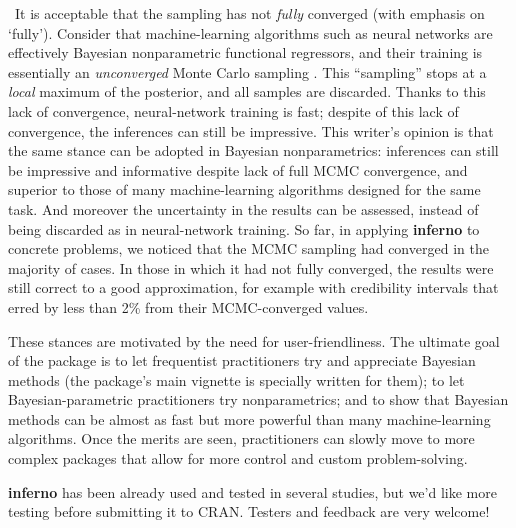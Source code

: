 \textbullet\ It is acceptable that the sampling has not \emph{fully} converged (with emphasis on `fully'). Consider that machine-learning algorithms such as neural networks are effectively Bayesian nonparametric functional regressors, and their training is essentially an \emph{unconverged} Monte Carlo sampling \citep{mackay1992,gal2016,mandtetal2017,huszar2017}. This ``sampling'' stops at a \emph{local} maximum of the posterior, and all samples are discarded. Thanks to this lack of convergence, neural-network training is fast; despite of this lack of convergence, the inferences can still be impressive. This writer's opinion is that the same stance can be adopted in Bayesian nonparametrics: inferences can still be impressive and informative despite lack of full MCMC convergence, and superior to those of many machine-learning algorithms designed for the same task. And moreover the uncertainty in the results can be assessed, instead of being discarded as in neural-network training. So far, in applying \textbf{inferno} to concrete problems, we noticed that the MCMC sampling had converged in the majority of cases. In those in which it had not fully converged, the results were still correct to a good approximation, for example with credibility intervals that erred by less than 2\% from their MCMC-converged values.

These stances are motivated by the need for user-friendliness. The ultimate goal of the package is to let frequentist practitioners try and appreciate Bayesian methods (the package's main vignette is specially written for them); to let Bayesian-parametric practitioners try nonparametrics; and to show that Bayesian methods can be almost as fast but more powerful than many machine-learning algorithms. Once the  merits are seen, practitioners can slowly move to more complex packages that allow for more control and custom problem-solving.

\textbf{inferno} has been already used and tested in several studies, but we'd like more testing before submitting it to CRAN. Testers and feedback are very welcome!




{\small

}


